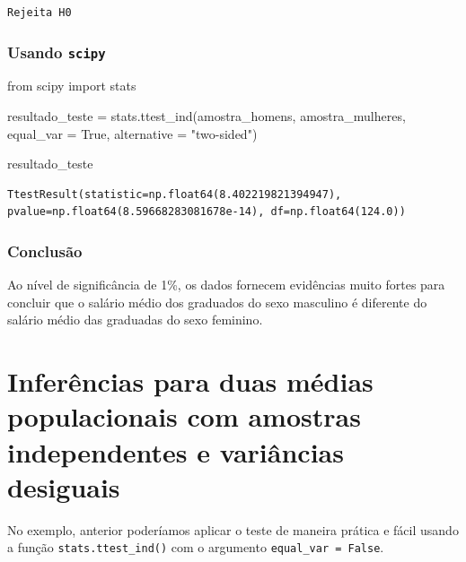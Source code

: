 \documentclass[
  letterpaper,
  DIV=11,
  numbers=noendperiod]{scrreprt}
\newenvironment{Shaded}{\begin{snugshade}}{\end{snugshade}}
\newcommand{\ImportTok}[1]{\textcolor[rgb]{0.00,0.46,0.62}{#1}}
\newcommand{\NormalTok}[1]{\textcolor[rgb]{0.00,0.23,0.31}{#1}}
\newcommand{\OperatorTok}[1]{\textcolor[rgb]{0.37,0.37,0.37}{#1}}
\newcommand{\StringTok}[1]{\textcolor[rgb]{0.13,0.47,0.30}{#1}}
\newcommand{\VariableTok}[1]{\textcolor[rgb]{0.07,0.07,0.07}{#1}}
\begin{document}
\begin{verbatim}
Rejeita H0
\end{verbatim}

\subsubsection{\texorpdfstring{Usando
\texttt{scipy}}{Usando scipy}}\label{usando-scipy}

\begin{Shaded}
\begin{Highlighting}[]
\ImportTok{from}\NormalTok{ scipy }\ImportTok{import}\NormalTok{ stats}

\NormalTok{resultado\_teste }\OperatorTok{=}\NormalTok{ stats.ttest\_ind(amostra\_homens, amostra\_mulheres, }
\NormalTok{                              equal\_var }\OperatorTok{=} \VariableTok{True}\NormalTok{, }
\NormalTok{                              alternative }\OperatorTok{=} \StringTok{"two{-}sided"}\NormalTok{)}

\NormalTok{resultado\_teste}
\end{Highlighting}
\end{Shaded}

\begin{verbatim}
TtestResult(statistic=np.float64(8.402219821394947), pvalue=np.float64(8.59668283081678e-14), df=np.float64(124.0))
\end{verbatim}

\subsubsection{Conclusão}\label{conclusuxe3o-2}

Ao nível de significância de 1\%, os dados fornecem evidências muito
fortes para concluir que o salário médio dos graduados do sexo masculino
é diferente do salário médio das graduadas do sexo feminino.

\section{Inferências para duas médias populacionais com amostras
independentes e variâncias
desiguais}\label{inferuxeancias-para-duas-muxe9dias-populacionais-com-amostras-independentes-e-variuxe2ncias-desiguais}

No exemplo, anterior poderíamos aplicar o teste de maneira prática e
fácil usando a função \texttt{stats.ttest\_ind()} com o argumento
\texttt{equal\_var\ =\ False}.
\end{document}
